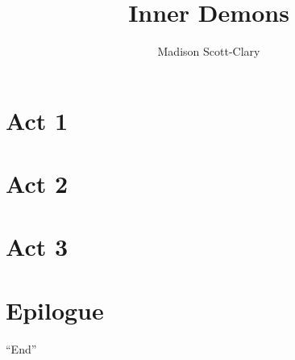 \documentclass[12pt,letterpaper,oneside]{memoir}
\title{Inner Demons}
\author{Madison Scott-Clary}
\begin{document}
  \maketitle

  \newpage

  \tableofcontents

  \part{Act 1}
  
  

  \part{Act 2}
  
  

  \part{Act 3}
  
  
  
  

  \part{Epilogue}
  

  \begin{center}
    ``End''
  \end{center}
\end{document}
